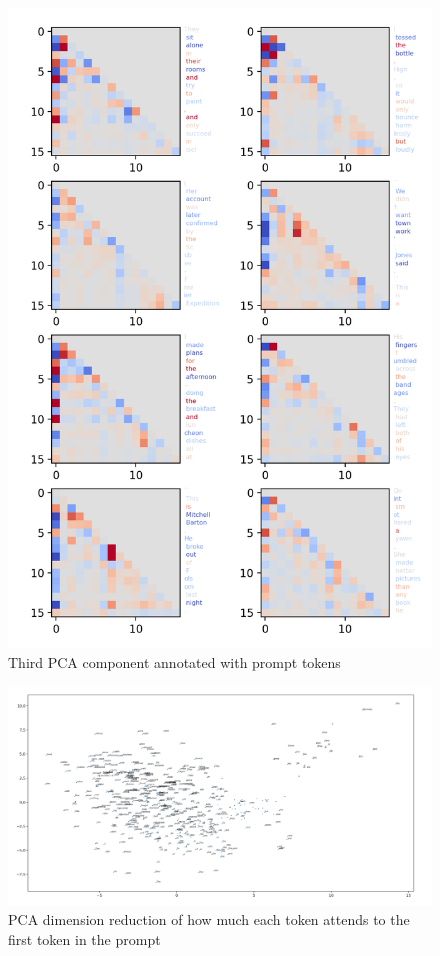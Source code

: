 \documentclass{article}
\begin{document}
\begin{figure}
    \includegraphics[width=\textwidth]{images/pca-component-2.png}
    \caption{Third PCA component annotated with prompt tokens}
    \label{fig:pca-component-2}
\end{figure}

\begin{figure}
    \includegraphics[width=\textwidth]{images/attending-to-first-token.png}
    \caption{PCA dimension reduction of how much each token attends to the first token in the prompt}
    \label{fig:attending-to-first-token}
\end{figure}
\end{document}
